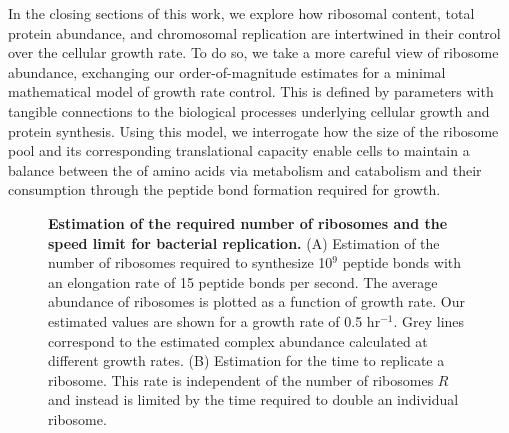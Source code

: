In the closing sections of this work, we explore how ribosomal content, total
protein abundance, and chromosomal replication are intertwined in their control
over the cellular growth rate. To do so, we take a more careful view of ribosome
abundance, exchanging our order-of-magnitude estimates for a minimal
mathematical model of growth rate control. This is defined by parameters with
tangible connections to the biological processes underlying cellular growth and
protein synthesis. Using this model, we interrogate how the size of the ribosome
pool and its corresponding translational capacity enable cells to maintain a
balance  between the of amino acids via metabolism and catabolism and their
consumption through the peptide bond formation required for growth.

\begin{figure}
        \caption{\textbf{Estimation of the required number of ribosomes and the
        speed limit for bacterial replication.} (A) Estimation of the
        number of ribosomes required to synthesize 10$^9$ peptide bonds with an
        elongation rate of 15 peptide bonds per second. The
        average abundance of ribosomes is plotted as a function of growth rate.
        Our estimated values are shown for a growth rate of 0.5 hr$^{-1}$.
        Grey lines correspond to the estimated complex abundance calculated at
        different growth rates. (B) Estimation for the time to replicate a
        ribosome. This rate is independent of the number of ribosomes $R$ and instead is limited by the time required to
        double an individual ribosome.} \label{fig:protein_synthesis}


\end{figure}
